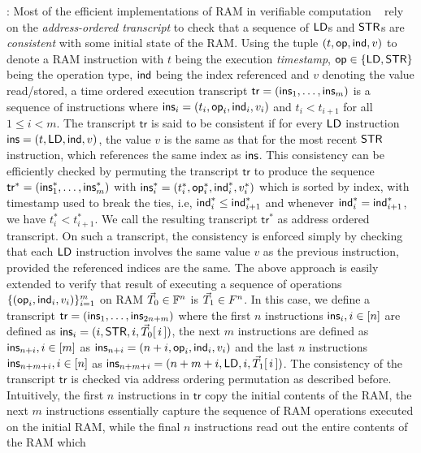 \documentclass[11pt]{article}
\begin{document}
    : Most of the efficient implementations of RAM in verifiable computation ~\cite{C:BCGTV13, NDSS:WSRBW15, SP:ZGKPP18}
    rely on the {\em address-ordered transcript} to check that a sequence of $\mathsf{LD}$s and $\mathsf{STR}$s are {\em consistent} with some initial state
    of the RAM. Using the tuple $(t,\mathsf{op},\mathsf{ind}, v)$ to denote a RAM instruction with $t$ being the execution {\em timestamp}, $\mathsf{op}\in \{\mathsf{LD},\mathsf{STR}\}$ being
    the operation type, $\mathsf{ind}$ being the index referenced and $v$ denoting the value read/stored, a time ordered execution transcript $\mathsf{tr} = (\mathsf{ins}_1,\ldots,\mathsf{ins}_m)$ is a sequence
    of instructions where $\mathsf{ins}_i=(t_i,\mathsf{op}_i,\mathsf{ind}_i, v_i)$ and $t_i < t_{i+1}$ for all $1\leq i<m$. The transcript $\mathsf{tr}$ is said to be consistent if
    for every $\mathsf{LD}$ instruction $\mathsf{ins}=(t,\mathsf{LD},\mathsf{ind},v)$, the value $v$ is the same as that for the most recent $\mathsf{STR}$ instruction, which references the same index
    as $\mathsf{ins}$. This consistency can be efficiently checked by permuting the transcript $\mathsf{tr}$ to produce the sequence
    $\mathsf{tr}^\ast=(\mathsf{ins}_1^\ast,\ldots,\mathsf{ins}_m^\ast)$ with $\mathsf{ins}_i^\ast=(t_i^\ast,\mathsf{op}_i^\ast,\mathsf{ind}_i^\ast,v_i^\ast)$ which is sorted by index, with
    timestamp used to break the ties, i.e, $\mathsf{ind}_i^\ast\leq \mathsf{ind}_{i+1}^\ast$ and whenever $\mathsf{ind}_i^\ast=\mathsf{ind}_{i+1}^\ast$, we have $t_i^\ast < t_{i+1}^\ast$.
    We call the resulting transcript $\mathsf{tr}^\ast$ as address ordered transcript. On such a transcript, the consistency is enforced simply by
    checking that each $\mathsf{LD}$ instruction involves the same value $v$ as the previous instruction, provided the referenced indices are the same.
    The above approach is easily extended to verify that result of executing a sequence of operations $\{(\mathsf{op}_i,\mathsf{ind}_i,v_i)\}_{i=1}^m$ on
    RAM $\vec{T}_0\in \mathbb{F}^n$ is $\vec{T}_1\in F^n$. In this case, we define a transcript $\mathsf{tr}=(\mathsf{ins}_1,\ldots,\mathsf{ins}_{2n+m})$ where the
    first $n$ instructions $\mathsf{ins}_i,i\in [n]$ are defined as $\mathsf{ins}_i=(i,\mathsf{STR},i,\vec{T}_0[\,i\,])$, the next $m$ instructions are defined
    as $\mathsf{ins}_{n+i},i\in [m]$ as $\mathsf{ins}_{n+i}=(n+i, \mathsf{op}_i, \mathsf{ind}_i, v_i)$ and the last $n$ instructions $\mathsf{ins}_{n+m+i}, i\in [n]$ as
    $\mathsf{ins}_{n+m+i}=(n+m+i,\mathsf{LD},i,\vec{T}_1[\,i\,])$. The consistency of the transcript $\mathsf{tr}$ is checked via address ordering permutation as
    described before. Intuitively, the first $n$ instructions in $\mathsf{tr}$ copy the initial contents of the RAM, the next $m$ instructions essentially
    capture the sequence of RAM operations executed on the initial RAM, while the final $n$ instructions read out the entire contents of the RAM which
\end{document}
